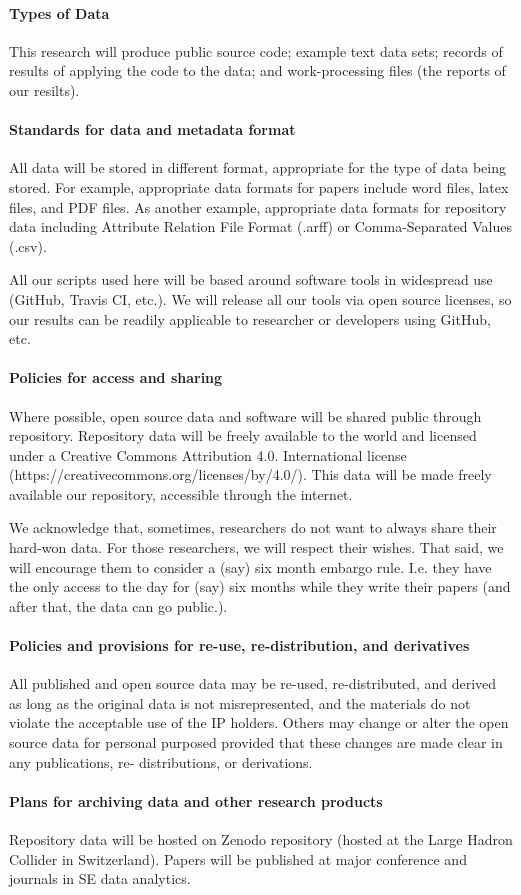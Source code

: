 \paragraph{Types of Data}
This research will produce public source code; example text data sets; records of results of applying the code to the data; and work-processing files (the reports of our resilts).
\vspace{8pt}

\paragraph{Standards for data and metadata format}
All data will be stored in different format, appropriate for the type of data being stored. For example, appropriate data formats for papers include word files, latex files, and PDF files. As another example, appropriate data formats for repository data including Attribute Relation File Format (.arff) or Comma-Separated Values (.csv). 
\vspace{8pt}

\noindent
All our scripts used here will be based around software tools in widespread use (GitHub, Travis CI, etc.). We will release all our tools via open source licenses, so our results can be readily applicable to researcher or developers using GitHub, etc. 
\vspace{8pt}

\paragraph{Policies for access and sharing}
Where possible, open source data and software will be shared public through repository. Repository data will be freely available to the world and licensed under a Creative Commons Attribution 4.0. International license (https://creativecommons.org/licenses/by/4.0/). This data will be made freely available our repository, accessible through the internet. 
\vspace{8pt}

\noindent
We acknowledge that, sometimes, researchers do not want to always share their hard-won data. For those researchers, we will respect their wishes. That said, we will encourage them to consider a (say) six month embargo rule. I.e. they have the only access to the day for (say) six months while they write their papers (and after that, the data can go public.). 
\vspace{8pt}

\paragraph{Policies and provisions for re-use, re-distribution, and derivatives}
All published and open source data may be re-used, re-distributed, and derived as long as the original data is not misrepresented, and the materials do not violate the acceptable use of the IP holders. Others may change or alter the open source data for personal purposed provided that these changes are made clear in any publications, re- distributions, or derivations. 
\vspace{8pt}

\paragraph{Plans for archiving data and other research products}
Repository data will be hosted on Zenodo repository (hosted at the Large Hadron Collider in Switzerland). Papers will be published at major conference and journals in SE data analytics.